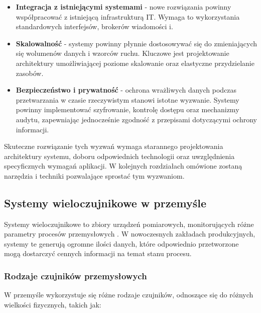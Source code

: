\begin{itemize}
    \item \textbf{Integracja z istniejącymi systemami} - nowe rozwiązania powinny współpracować z istniejącą infrastrukturą IT. Wymaga to wykorzystania standardowych interfejsów, brokerów wiadomości i.
    
    \item \textbf{Skalowalność} - systemy powinny płynnie dostosowywać się do zmieniających się wolumenów danych i wzorców ruchu. Kluczowe jest projektowanie architektury umożliwiającej poziome skalowanie oraz elastyczne przydzielanie zasobów.
    
    \item \textbf{Bezpieczeństwo i prywatność} - ochrona wrażliwych danych podczas przetwarzania w czasie rzeczywistym stanowi istotne wyzwanie. Systemy powinny implementować szyfrowanie, kontrolę dostępu oraz mechanizmy audytu, zapewniając jednocześnie zgodność z przepisami dotyczącymi ochrony informacji.
\end{itemize}

Skuteczne rozwiązanie tych wyzwań wymaga starannego projektowania architektury systemu, doboru odpowiednich technologii oraz uwzględnienia specyficznych wymagań aplikacji. W kolejnych rozdziałach omówione zostaną narzędzia i techniki pozwalające sprostać tym wyzwaniom.

\subsection{Systemy wieloczujnikowe w przemyśle}
\label{subsec:systemy_wieloczujnikowe}

Systemy wieloczujnikowe to zbiory urządzeń pomiarowych, monitorujących różne parametry procesów przemysłowych \cite{multisensor_systems}.
W nowoczesnych zakładach produkcyjnych, systemy te generują ogromne ilości danych, które odpowiednio przetworzone mogą dostarczyć cennych informacji na temat stanu procesu.

\subsubsection{Rodzaje czujników przemysłowych}
\label{subsubsec:rodzaje_czujnikow}

W przemyśle wykorzystuje się różne rodzaje czujników, odnoszące się do różnych wielkości fizycznych, takich jak:

